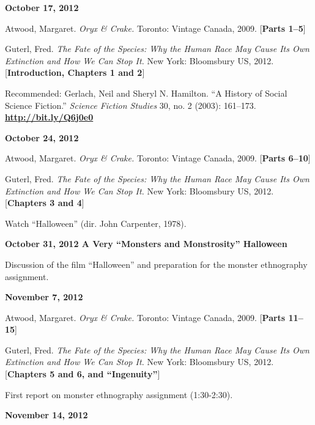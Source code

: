 \documentclass[12pt]{article}
\begin{document}
\textbf{October 17, 2012}

\begin{hangparas}{.5in}{1}
Atwood, Margaret. \textit{Oryx \& Crake.} Toronto: Vintage Canada, 2009. [\textbf{Parts 1--5}]

Guterl, Fred. \textit{The Fate of the Species: Why the Human Race May Cause Its Own Extinction and How We Can Stop It.} New York: Bloomsbury US, 2012. [\textbf{Introduction, Chapters 1 and 2}]

Recommended: Gerlach, Neil and Sheryl N. Hamilton. ``A History of Social Science Fiction.'' \textit{Science Fiction Studies} 30, no. 2 (2003): 161--173. \href{http://bit.ly/Q6j0e0}{\textbf{http://bit.ly/Q6j0e0}}
\end{hangparas}

\textbf{October 24, 2012}

\begin{hangparas}{.5in}{1}
Atwood, Margaret. \textit{Oryx \& Crake.} Toronto: Vintage Canada, 2009. [\textbf{Parts 6--10}]

Guterl, Fred. \textit{The Fate of the Species: Why the Human Race May Cause Its Own Extinction and How We Can Stop It.} New York: Bloomsbury US, 2012. [\textbf{Chapters 3 and 4}]
\end{hangparas}

Watch ``Halloween'' (dir. John Carpenter, 1978).

\textbf{October 31, 2012 \hspace{.0625in} \Bat \hspace{.0625in} A Very ``Monsters and Monstrosity'' Halloween \hspace{.0625in} \Bat}

Discussion of the film ``Halloween'' and preparation for the monster ethnography assignment.

\newpage

\textbf{November 7, 2012}

\begin{hangparas}{.5in}{1}
Atwood, Margaret. \textit{Oryx \& Crake.} Toronto: Vintage Canada, 2009. [\textbf{Parts 11--15}]

Guterl, Fred. \textit{The Fate of the Species: Why the Human Race May Cause Its Own Extinction and How We Can Stop It.} New York: Bloomsbury US, 2012. [\textbf{Chapters 5 and 6, and ``Ingenuity''}]
\end{hangparas}

First report on monster ethnography assignment (1:30-2:30).

\textbf{November 14, 2012}
\end{document}
